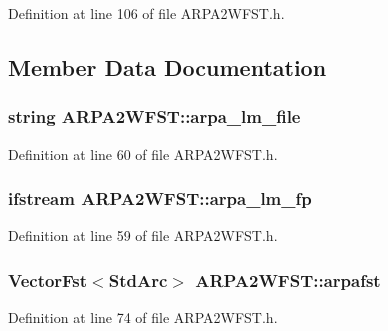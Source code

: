 Definition at line 106 of file A\+R\+P\+A2\+W\+F\+S\+T.\+h.



\subsection{Member Data Documentation}
\subsubsection[{arpa\+\_\+lm\+\_\+file}]{\setlength{\rightskip}{0pt plus 5cm}string A\+R\+P\+A2\+W\+F\+S\+T\+::arpa\+\_\+lm\+\_\+file}\hypertarget{class_a_r_p_a2_w_f_s_t_adb975c2928af5caf83b23f49286d10a2}{}\label{class_a_r_p_a2_w_f_s_t_adb975c2928af5caf83b23f49286d10a2}


Definition at line 60 of file A\+R\+P\+A2\+W\+F\+S\+T.\+h.

\subsubsection[{arpa\+\_\+lm\+\_\+fp}]{\setlength{\rightskip}{0pt plus 5cm}ifstream A\+R\+P\+A2\+W\+F\+S\+T\+::arpa\+\_\+lm\+\_\+fp}\hypertarget{class_a_r_p_a2_w_f_s_t_a864de8947d779a07aac4fd5fad5eada8}{}\label{class_a_r_p_a2_w_f_s_t_a864de8947d779a07aac4fd5fad5eada8}


Definition at line 59 of file A\+R\+P\+A2\+W\+F\+S\+T.\+h.

\subsubsection[{arpafst}]{\setlength{\rightskip}{0pt plus 5cm}Vector\+Fst$<$Std\+Arc$>$ A\+R\+P\+A2\+W\+F\+S\+T\+::arpafst}\hypertarget{class_a_r_p_a2_w_f_s_t_a2f34de8cb879f22a716881fd867854ed}{}\label{class_a_r_p_a2_w_f_s_t_a2f34de8cb879f22a716881fd867854ed}


Definition at line 74 of file A\+R\+P\+A2\+W\+F\+S\+T.\+h.

